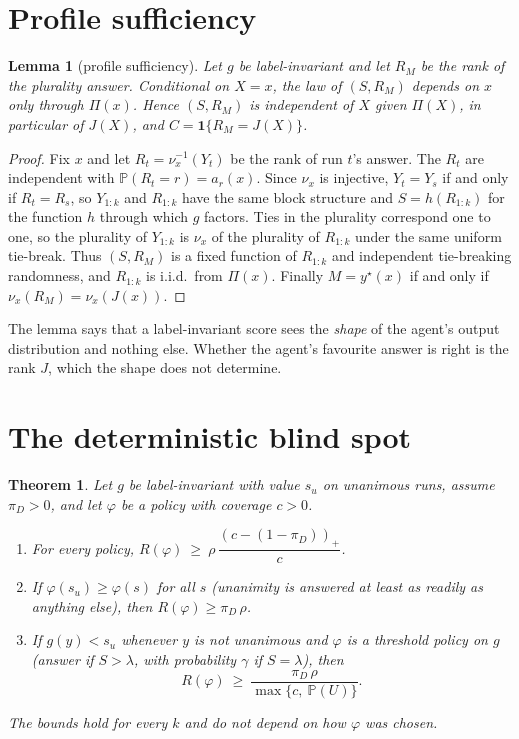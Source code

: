 \documentclass[11pt]{article}
\newtheorem{theorem}{Theorem}
\newtheorem{lemma}{Lemma}
\theoremstyle{definition}
\renewcommand{\P}{\mathbb{P}}
\newcommand{\ind}{\mathbf{1}}
\begin{document}
\section{Profile sufficiency}

\begin{lemma}[profile sufficiency]\label{lem:profile}
Let $g$ be label-invariant and let $R_M$ be the rank of the plurality answer. Conditional on
$X=x$, the law of $(S,R_M)$ depends on $x$ only through $\Pi(x)$. Hence $(S,R_M)$ is independent of
$X$ given $\Pi(X)$, in particular of $J(X)$, and $C=\ind\{R_M=J(X)\}$.
\end{lemma}

\begin{proof}
Fix $x$ and let $R_t=\nu_x^{-1}(Y_t)$ be the rank of run $t$'s answer. The $R_t$ are independent with
$\P(R_t=r)=a_r(x)$. Since $\nu_x$ is injective, $Y_t=Y_s$ if and only if $R_t=R_s$, so $Y_{1:k}$ and
$R_{1:k}$ have the same block structure and $S=h(R_{1:k})$ for the function $h$ through which $g$
factors. Ties in the plurality correspond one to one, so the plurality of $Y_{1:k}$ is
$\nu_x$ of the plurality of $R_{1:k}$ under the same uniform tie-break. Thus $(S,R_M)$ is a fixed
function of $R_{1:k}$ and independent tie-breaking randomness, and $R_{1:k}$ is i.i.d.\ from
$\Pi(x)$. Finally $M=y^\star(x)$ if and only if $\nu_x(R_M)=\nu_x(J(x))$.
\end{proof}

The lemma says that a label-invariant score sees the \emph{shape} of the agent's output
distribution and nothing else. Whether the agent's favourite answer is right is the rank $J$,
which the shape does not determine.

\section{The deterministic blind spot}

\begin{theorem}\label{thm:floor}
Let $g$ be label-invariant with value $s_u$ on unanimous runs, assume $\pi_D>0$, and let
$\varphi$ be a policy with coverage $c>0$.
\begin{enumerate}[label=(\alph*),itemsep=2pt]
\item For every policy, $R(\varphi)\ \ge\ \rho\,\dfrac{(c-(1-\pi_D))_+}{c}$.
\item If $\varphi(s_u)\ge\varphi(s)$ for all $s$ (unanimity is answered at least as readily as
anything else), then $R(\varphi)\ge\pi_D\,\rho$.
\item If $g(y)<s_u$ whenever $y$ is not unanimous and $\varphi$ is a threshold policy on $g$
(answer if $S>\lambda$, with probability $\gamma$ if $S=\lambda$), then
\[
R(\varphi)\ \ge\ \frac{\pi_D\,\rho}{\max\{c,\ \P(U)\}}.
\]
\end{enumerate}
The bounds hold for every $k$ and do not depend on how $\varphi$ was chosen.
\end{theorem}
\end{document}
